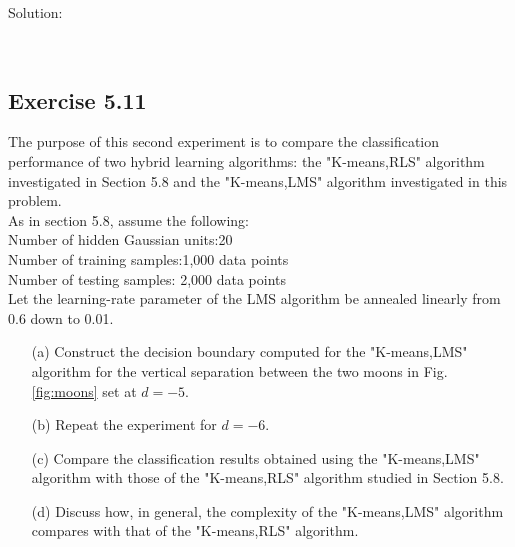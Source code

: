 \documentclass[a4paper, 12pt]{article}
\begin{document}
Solution:

\lstset{language=Python}
\begin{lstlisting}[frame=single]


\end{lstlisting}

\subsection{Exercise 5.11}
The purpose of this second experiment is to compare the classification performance of two hybrid learning algorithms: the "K-means,RLS" algorithm investigated in Section 5.8 and the "K-means,LMS" algorithm investigated in this problem.\\
	As in section 5.8, assume the following:\\
Number of hidden Gaussian units:20\\
Number of training samples:1,000 data points\\
Number of testing samples: 2,000 data points\\
Let the learning-rate parameter of the LMS algorithm be annealed linearly from 0.6 down to 0.01.
\begin{itemize}
\item[(a)] Construct the decision boundary computed for the "K-means,LMS" algorithm for the vertical separation between the two moons in Fig.\ref{fig:moons} set at $d=-5$.
\item[(b)] Repeat the experiment for $d=-6$.
\item[(c)] Compare the classification results obtained using the "K-means,LMS" algorithm with those of the "K-means,RLS" algorithm studied in Section 5.8.
\item[(d)] Discuss how, in general, the complexity of the "K-means,LMS" algorithm compares with that of the "K-means,RLS" algorithm.
\end{itemize}
\end{document}
